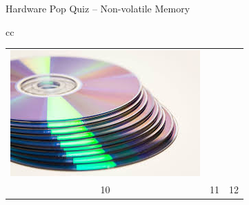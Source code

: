 \documentclass[compress,11pt,xcolor=svgnames,aspectratio=169]{beamer}
\begin{document}
\begin{frame}[fragile] {Hardware Pop Quiz -- Non-volatile Memory}
\begin{center}
\begin{tabular}{cc}
\begin{tabular}{ccc}
\includegraphics[scale=0.15]{fig/cd} \\
10 & 11 & 12 \\
\end{tabular}

\end{tabular}

\end{center}

\end{frame}
\end{document}
